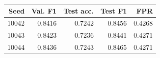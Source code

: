 \begin{tabular}{rrrrr}
\toprule
Seed & Val. F1 & Test acc. & Test F1 & FPR \\
\midrule
10042 & 0.8416 & 0.7242 & 0.8456 & 0.4268 \\
10043 & 0.8423 & 0.7236 & 0.8441 & 0.4271 \\
10044 & 0.8436 & 0.7243 & 0.8465 & 0.4271 \\
\bottomrule
\end{tabular}
